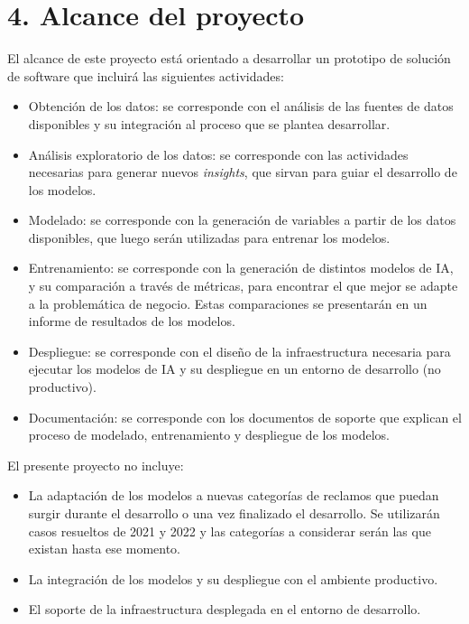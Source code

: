 \documentclass[
11pt, %
]{charter}
\begin{document}
\section{4. Alcance del proyecto}
\label{sec:alcance}

El alcance de este proyecto está orientado a desarrollar un prototipo de solución de software que incluirá las siguientes actividades:

\begin{itemize}
	\item Obtención de los datos: se corresponde con el análisis de las fuentes de datos disponibles y su integración al proceso que se plantea desarrollar.
	\item Análisis exploratorio de los datos: se corresponde con las actividades necesarias para generar nuevos \textit{insights}, que sirvan para guiar el desarrollo de los modelos.
	\item Modelado: se corresponde con la generación de variables a partir de los datos disponibles, que luego serán utilizadas para entrenar los modelos. 
	\item Entrenamiento: se corresponde con la generación de distintos modelos de IA, y su comparación a través de métricas, para encontrar el que mejor se adapte a la problemática de negocio. Estas comparaciones se presentarán en un informe de resultados de los modelos.
	\item Despliegue: se corresponde con el diseño de la infraestructura necesaria para ejecutar los modelos de IA y su despliegue en un entorno de desarrollo (no productivo).
	\item Documentación: se corresponde con los documentos de soporte que explican el proceso de modelado, entrenamiento y despliegue de los modelos.
\end{itemize}

El presente proyecto no incluye:

\begin{itemize}
	\item La adaptación de los modelos a nuevas categorías de reclamos que puedan surgir durante el desarrollo o una vez finalizado el desarrollo. Se utilizarán casos resueltos de 2021 y 2022 y las categorías a considerar serán las que existan hasta ese momento. 
	\item La integración de los modelos y su despliegue con el ambiente productivo.
	\item El soporte de la infraestructura desplegada en el entorno de desarrollo.
\end{itemize}
\end{document}
